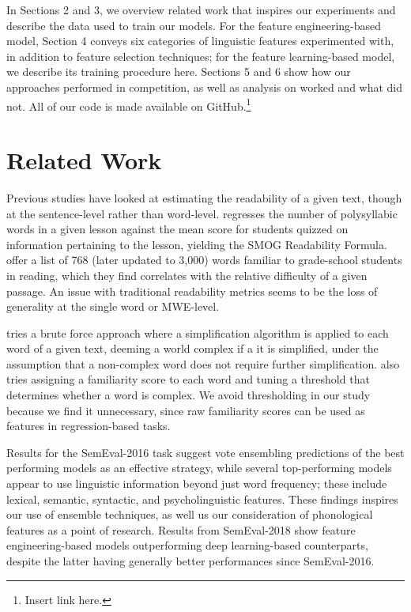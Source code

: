 \documentclass[11pt,a4paper]{article}
\begin{document}
In Sections 2 and 3, we overview related work that inspires our experiments and describe the data used to train our models. For the feature engineering-based model, Section 4 conveys six categories of linguistic features experimented with, in addition to feature selection techniques; for the feature learning-based model, we describe its training procedure here. Sections 5 and 6 show how our approaches performed in competition, as well as analysis on worked and what did not. All of our code is made available on GitHub.\footnote{Insert link here.}

\section{Related Work}

Previous studies have looked at estimating the readability of a given text, though at the sentence-level rather than word-level. \citet{10.2307/40011226} regresses the number of polysyllabic words in a given lesson against the mean score for students quizzed on information pertaining to the lesson, yielding the SMOG Readability Formula. \citet{10.2307/1473169} offer a list of 768 (later updated to 3,000) words familiar to grade-school students in reading, which they find correlates with the relative difficulty of a given passage. An issue with traditional readability metrics seems to be the loss of generality at the single word or MWE-level.

\citet{shardlow2013comparison} tries a brute force approach where a simplification algorithm is applied to each word of a given text, deeming a world complex if a it is simplified, under the assumption that a non-complex word does not require further simplification. \citet{shardlow2013comparison} also tries assigning a familiarity score to each word and tuning a threshold that determines whether a word is complex. We avoid thresholding in our study because we find it unnecessary, since raw familiarity scores can be used as features in regression-based tasks. 

Results for the SemEval-2016 task \citep{zampieriEtAl:2017:NLPTEA} suggest vote ensembling predictions of the best performing models as an effective strategy, while several top-performing models \citep{paetzoldspecia2016sv000gg, ronzanoetal2016taln, mukherjeeetal2016ju} appear to use linguistic information beyond just word frequency; these include lexical, semantic, syntactic, and psycholinguistic features. These findings inspires our use of ensemble techniques, as well us our consideration of phonological features as a point of research. Results from SemEval-2018 show feature engineering-based models outperforming deep learning-based counterparts, despite the latter having generally better performances since SemEval-2016.
\end{document}
